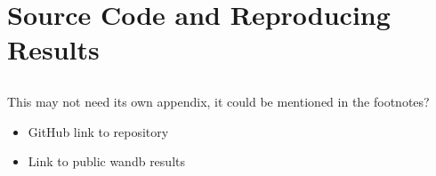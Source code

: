 \chapter{Source Code and Reproducing Results}
\section{}

{\color{red}
This may not need its own appendix, it could be mentioned in the footnotes?

\begin{itemize}
    \item GitHub link to repository
    \item Link to public wandb results
\end{itemize}
}